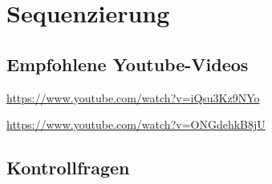 \section{Sequenzierung}





\subsection{Empfohlene Youtube-Videos}
\begin{description}[align=left]
    \item [PCR] \href{https://www.youtube.com/watch?v=iQsu3Kz9NYo}{https://www.youtube.com/watch?v=iQsu3Kz9NYo}
    \item [Sanger-Sequenzierung] \href{https://www.youtube.com/watch?v=ONGdehkB8jU}{https://www.youtube.com/watch?v=ONGdehkB8jU}
\end{description}

\subsection{Kontrollfragen} 

